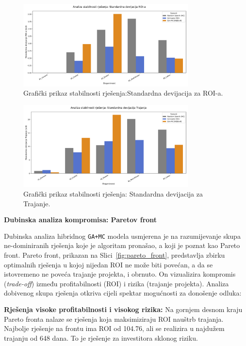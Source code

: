 \begin{figure}[H]
    \centering
        \includegraphics[width=0.8\textwidth]{slike/grafikoni_final/C_stabilnost_roi.png}
        \caption{Grafički prikaz stabilnosti rješenja:Standardna devijacija za ROI-a.}
        \label{fig:stabilnost_roi}
    \end{figure}
    \begin{figure}[H]
        \centering
        \includegraphics[width=0.8\textwidth]{slike/grafikoni_final/C_stabilnost_trajanje.png}
    \caption{Grafički prikaz stabilnosti rješenja: Standardna devijacija za Trajanje.}
    \label{fig:stabilnost_trajanje}
\end{figure}

\textbf{Dubinska analiza kompromisa: Paretov front}

Dubinska analiza hibridnog \texttt{GA+MC} modela usmjerena je na razumijevanje skupa ne-dominiranih rješenja koje je algoritam pronašao, a koji je poznat kao Pareto front. Pareto front, prikazan na Slici~\ref{fig:pareto_front}, predstavlja zbirku optimalnih rješenja u kojoj nijedan ROI ne može biti povećan, a da se istovremeno ne poveća trajanje projekta, i obrnuto. On vizualizira kompromis (\textit{trade-off}) između profitabilnosti (ROI) i rizika (trajanje projekta).
Analiza dobivenog skupa rješenja otkriva cijeli spektar mogućnosti za donošenje odluka:

\textbf{Rješenja visoke profitabilnosti i visokog rizika:} Na gornjem desnom kraju Pareto fronta nalaze se rješenja koja maksimiziraju ROI nauštrb trajanja. Najbolje rješenje na frontu ima ROI od 104.76, ali se realizira u najdužem trajanju od 648 dana. To je rješenje za investitora sklonog riziku.

